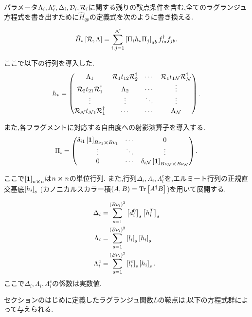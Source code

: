 パラメータ$\Lambda_{i},\Lambda^{c}_{i},\Delta_{i},\mathcal{D}_{i},\mathcal{R}_{i}$に関する残りの鞍点条件を含む,全てのラグランジュ方程式を書き出すために$\hat{H}_{qp}$の定義式を次のように書き換える.

\begin{equation}
    \hat{H}_{*}\left[ \mathcal{R},\Lambda \right]=\sum_{i,j=1}^{\mathcal{N}}\left[ \Pi_{i}h_{*}\Pi_{j} \right]_{ab}f^\dagger_{ia}f_{jb}.
\end{equation}

ここで以下の行列を導入した.
\begin{equation}
    h_{*}=\pmqty{\Lambda_{1} &\hR_{1}t_{12}\hR\dgr_{2}& \cdots &\hR_{1}t_{1\hN}\hR\dgr_{\hN} \\ \hR_{2}t_{21}\hR\dgr_{1}&\Lambda_{2} &\cdots &\vdots \\
    \vdots &\vdots  &\ddots  &\vdots\\
    \hR_{\hN}t_{\hN 1}\hR\dgr_{1} &\cdots &\cdots &\Lambda_{\hN}}.
\end{equation}

また,各フラグメントに対応する自由度への射影演算子を導入する.
\begin{equation}
    \Pi_{i}=\pmqty{\delta_{i1}\dkako{\bm{1}}_{B\nu_{1}\cross B\nu_{1}} &\cdots  &0\\
    \vdots &\ddots &\vdots \\
    0 &\cdots &\delta_{i\hN}\dkako{\bm{1}}_{B\nu_{\hN}\cross B\nu_{\hN}}}.
\end{equation}

ここで$\left[ \bm{1} \right]_{n\cross n}$は$n\cross n$の単位行列.
また,行列$\Delta_{i},\Lambda_{i},\Lambda^{c}_{i}$を,エルミート行列の正規直交基底$\left[ h_{i} \right]_{s}$ (カノニカルスカラー積$\left( A,B \right)=\Tr \left[ A^\dagger B \right]$)を用いて展開する.

\begin{align}
    \Delta_{i}=&\sum_{s=1}^{\left( B\nu_{i} \right)^{2}}\left[ d^{0}_{i} \right]_{s}\left[ h^{T}_{i} \right]_{s}\\
    \Lambda_{i}=& \sum_{s=1}^{\left( B\nu_{i} \right)^{2}}\left[ l_{i} \right]_{s}\left[ h_{i} \right]_{s}\\
    \Lambda^{c}_{i}=&\sum_{s=1}^{\left( B\nu_{i} \right)^{2}}\left[ l^{c}_{i} \right]_{s}\left[ h_{i} \right]_{s}.
\end{align}
ここで$\Delta_{i},\Lambda_{i},\Lambda^{c}_{i}$の係数は実数値.

セクションのはじめに定義したラグランジュ関数$L$の鞍点は,以下の方程式群によって与えられる.

